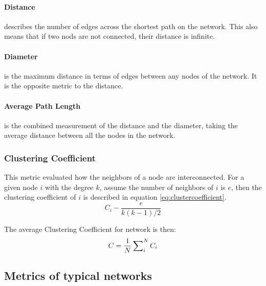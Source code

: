 		\paragraph{Distance} %
		\label{par:distance}
		describes the number of edges across the shortest path on the network.
		This also means that if two nods are not connected,
		their distance is infinite.

		\paragraph{Diameter} %
		\label{par:diameter}
		is the maximum distance in terms of edges between any nodes of the network.
		It is the opposite metric to the distance.

		\paragraph{Average Path Length} %
		\label{par:average_path_length}
		is the combined measurement of the distance and the diameter,
		taking the average distance between all the nodes in the network.

	\subsubsection{Clustering Coefficient} %
	\label{ssub:clustering_coefficient}
		This metric evaluated how the neighbors of a node are interconnected.
		For a given node $i$ with the degree $k$,
		assume the number of neighbors of $i$ is $e$,
		then the clustering coefficient of $i$ is described in equation \ref{eq:clustercoefficient}.
		\begin{equation}
		\label{eq:clustercoefficient}
		C_i - \frac{e}{k(k - 1)/2}
		\end{equation}

		The average Clustering Coefficient for network is then:
		\begin{equation}
		\label{eq:averagecc}
		C = \frac{1}{N} \sideset{}{_i^N}\sum C_i
		\end{equation}

\subsection{Metrics of typical networks} %
\label{sub:metrics_of_typical_networks}

